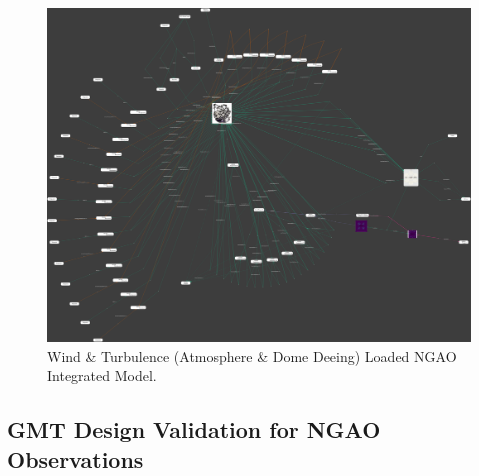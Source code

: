 \documentclass[]{AO4ELT}  %
\begin{document}
\begin{figure}
   \centering
   \includegraphics[width=\linewidth]{ngao-opm.2pi.png}
   \caption{Wind \& Turbulence (Atmosphere \& Dome Deeing) Loaded NGAO Integrated Model.}
   \label{fig:16b}
\end{figure}

\clearpage

\subsection{GMT Design Validation for NGAO Observations}
\label{sec:gmt-ngao-vv}
\end{document}
